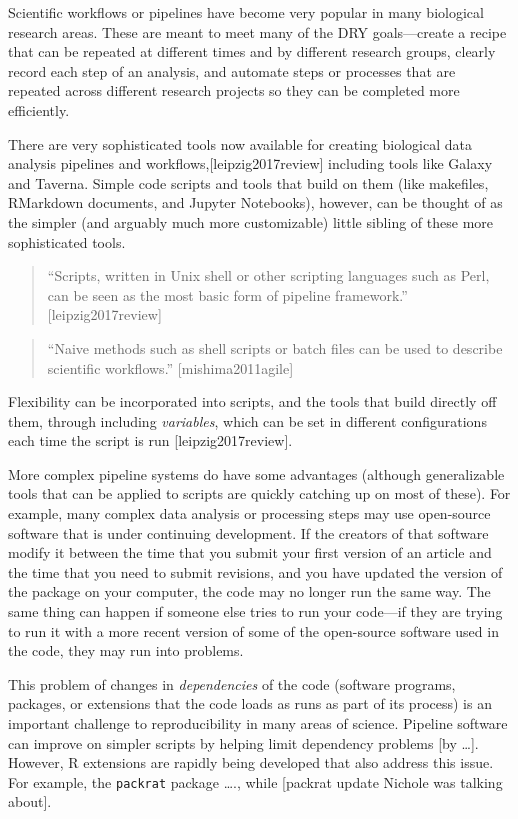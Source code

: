 \documentclass[]{tufte-book}
\begin{document}
Scientific workflows or pipelines have become very popular in many biological
research areas. These are meant to meet many of the DRY goals---create a
recipe that can be repeated at different times and by different research groups,
clearly record each step of an analysis, and automate steps or processes that
are repeated across different research projects so they can be completed
more efficiently.

There are very sophisticated tools now available for creating biological data
analysis pipelines and workflows,{[}leipzig2017review{]} including tools like Galaxy
and Taverna. Simple code scripts and tools that build on them (like makefiles,
RMarkdown documents, and Jupyter Notebooks), however, can be thought of as the
simpler (and arguably much more customizable) little sibling of these more
sophisticated tools.

\begin{quote}
``Scripts, written in Unix shell or other scripting languages such as Perl, can
be seen as the most basic form of pipeline framework.'' {[}leipzig2017review{]}
\end{quote}

\begin{quote}
``Naive methods such as shell scripts or batch files can be used to describe
scientific workflows.'' {[}mishima2011agile{]}
\end{quote}

Flexibility can be incorporated into scripts, and the tools that build directly off
them, through including \emph{variables}, which can be set in different configurations
each time the script is run {[}leipzig2017review{]}.

More complex pipeline systems do have some advantages (although generalizable tools
that can be applied to scripts are quickly catching up on most of these). For
example, many complex data analysis or processing steps may use open-source
software that is under continuing development. If the creators of that software
modify it between the time that you submit your first version of an article and
the time that you need to submit revisions, and you have updated the version
of the package on your computer, the code may no longer run the same way. The same
thing can happen if someone else tries to run your code---if they are trying to
run it with a more recent version of some of the open-source software used in the
code, they may run into problems.

This problem of changes in \emph{dependencies} of the code (software programs, packages,
or extensions that the code loads as runs as part of its process) is an important
challenge to reproducibility in many areas of science. Pipeline software can improve
on simpler scripts by helping limit dependency problems {[}by \ldots{]}. However,
R extensions are rapidly being developed that also address this issue. For example,
the \texttt{packrat} package \ldots., while {[}packrat update Nichole was talking about{]}.
\end{document}
